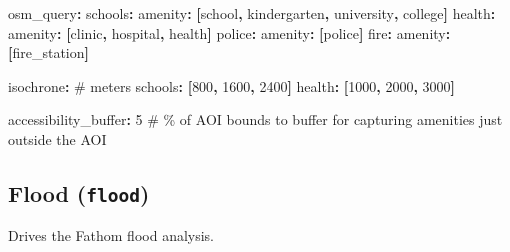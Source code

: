 \documentclass[
  letterpaper,
  DIV=11,
  numbers=noendperiod]{scrreprt}
\newenvironment{Shaded}{\begin{snugshade}}{\end{snugshade}}
\newcommand{\AttributeTok}[1]{\textcolor[rgb]{0.40,0.45,0.13}{#1}}
\newcommand{\CommentTok}[1]{\textcolor[rgb]{0.37,0.37,0.37}{#1}}
\newcommand{\DecValTok}[1]{\textcolor[rgb]{0.68,0.00,0.00}{#1}}
\newcommand{\FunctionTok}[1]{\textcolor[rgb]{0.28,0.35,0.67}{#1}}
\newcommand{\KeywordTok}[1]{\textcolor[rgb]{0.00,0.23,0.31}{\textbf{#1}}}
\begin{document}
\begin{Shaded}
\begin{Highlighting}[]
\FunctionTok{osm\_query}\KeywordTok{:}
\AttributeTok{  }\FunctionTok{schools}\KeywordTok{:}
\AttributeTok{    }\FunctionTok{amenity}\KeywordTok{:}\AttributeTok{ }\KeywordTok{[}\AttributeTok{school}\KeywordTok{,}\AttributeTok{ kindergarten}\KeywordTok{,}\AttributeTok{ university}\KeywordTok{,}\AttributeTok{ college}\KeywordTok{]}
\AttributeTok{  }\FunctionTok{health}\KeywordTok{:}
\AttributeTok{    }\FunctionTok{amenity}\KeywordTok{:}\AttributeTok{ }\KeywordTok{[}\AttributeTok{clinic}\KeywordTok{,}\AttributeTok{ hospital}\KeywordTok{,}\AttributeTok{ health}\KeywordTok{]}
\AttributeTok{  }\FunctionTok{police}\KeywordTok{:}
\AttributeTok{    }\FunctionTok{amenity}\KeywordTok{:}\AttributeTok{ }\KeywordTok{[}\AttributeTok{police}\KeywordTok{]}
\AttributeTok{  }\FunctionTok{fire}\KeywordTok{:}
\AttributeTok{    }\FunctionTok{amenity}\KeywordTok{:}\AttributeTok{ }\KeywordTok{[}\AttributeTok{fire\_station}\KeywordTok{]}

\FunctionTok{isochrone}\KeywordTok{:}\CommentTok{  \# meters}
\AttributeTok{  }\FunctionTok{schools}\KeywordTok{:}\AttributeTok{ }\KeywordTok{[}\DecValTok{800}\KeywordTok{,}\AttributeTok{ }\DecValTok{1600}\KeywordTok{,}\AttributeTok{ }\DecValTok{2400}\KeywordTok{]}
\AttributeTok{  }\FunctionTok{health}\KeywordTok{:}\AttributeTok{ }\KeywordTok{[}\DecValTok{1000}\KeywordTok{,}\AttributeTok{ }\DecValTok{2000}\KeywordTok{,}\AttributeTok{ }\DecValTok{3000}\KeywordTok{]}

\FunctionTok{accessibility\_buffer}\KeywordTok{:}\AttributeTok{ }\DecValTok{5}\CommentTok{   \# \% of AOI bounds to buffer for capturing amenities just outside the AOI}
\end{Highlighting}
\end{Shaded}

\subsection{\texorpdfstring{Flood
(\texttt{flood})}{Flood (flood)}}\label{flood-flood}

Drives the Fathom flood analysis.
\end{document}
